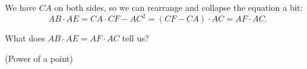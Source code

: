 

We have $CA$ on both sides, so we can rearrange and collapse the equation a bit:
$$ AB \cdot AE = CA \cdot CF - AC^2 =  (CF - CA)\cdot AC = AF \cdot AC . $$

What does $AB \cdot AE = AF \cdot AC$ tell us?
















(Power of a point)



